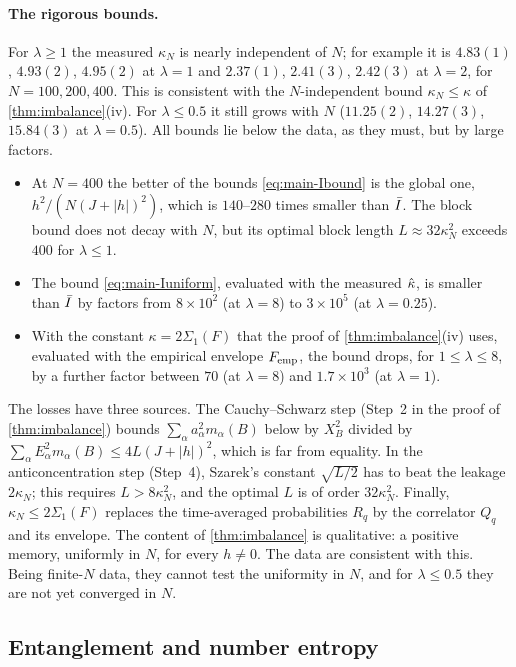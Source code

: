 \paragraph{The rigorous bounds.}  For $\lambda\ge1$ the measured $\kappa_N$ is nearly independent of $N$; for example
it is $4.83(1)$, $4.93(2)$, $4.95(2)$ at $\lambda=1$ and $2.37(1)$, $2.41(3)$, $2.42(3)$ at $\lambda=2$, for
$N=100,200,400$.  This is consistent with the $N$-independent bound $\kappa_N\le\kappa$ of \cref{thm:imbalance}(iv).  For $\lambda\le0.5$ it still
grows with $N$ ($11.25(2)$, $14.27(3)$, $15.84(3)$ at $\lambda=0.5$).  All bounds lie below the data, as they must,
but by large factors.
\begin{itemize}
\item At $N=400$ the better of the bounds \eqref{eq:main-Ibound} is the global one, $h^2/(N(J+|h|)^2)$, which is
$140$--$280$ times smaller than $\bar I$.  The block bound does not decay with $N$, but its optimal block length
$L\approx32\kappa_N^2$ exceeds $400$ for $\lambda\le1$.
\item The bound \eqref{eq:main-Iuniform}, evaluated with the measured $\hat\kappa$, is smaller than $\bar I$ by factors
from $8\times10^2$ (at $\lambda=8$) to $3\times10^5$ (at $\lambda=0.25$).
\item With the constant $\kappa=2\Sigma_1(F)$ that the proof of \cref{thm:imbalance}(iv) uses, evaluated with the
empirical envelope $F_{\mathrm{emp}}$, the bound drops, for $1\le\lambda\le8$, by a further factor between $70$ (at $\lambda=8$)
and $1.7\times10^3$ (at $\lambda=1$).
\end{itemize}
The losses have three sources.  The Cauchy--Schwarz step (Step~2 in the proof of \cref{thm:imbalance}) bounds
$\sum_\alpha a_\alpha^2m_\alpha(B)$ below by $X_B^2$ divided by $\sum_\alpha E_\alpha^2m_\alpha(B)\le4L(J+|h|)^2$, which is far
from equality.  In the anticoncentration step (Step~4), Szarek's constant $\sqrt{L/2}$ has to beat the leakage
$2\kappa_N$; this requires $L>8\kappa_N^2$, and the optimal $L$ is of order $32\kappa_N^2$.  Finally, $\kappa_N\le2\Sigma_1(F)$ replaces the time-averaged
probabilities $R_q$ by the correlator $Q_q$ and its envelope.  The content of \cref{thm:imbalance} is qualitative:
a positive memory, uniformly in $N$, for every $h\neq0$.  The data are consistent with this.  Being finite-$N$ data, they
cannot test the uniformity in $N$, and for $\lambda\le0.5$ they are not yet converged in $N$.

\subsection{Entanglement and number entropy}\label{sec:numerics:entropies}

